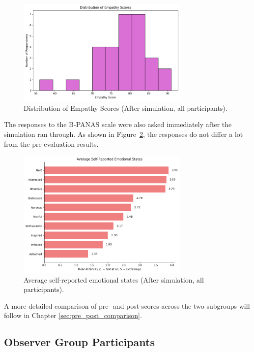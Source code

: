 \begin{figure}[H]
\centering
\includegraphics[width=0.75\textwidth]{../../Figures/empathy_scores_post_all.png}
\caption{Distribution of Empathy Scores (After simulation, all participants).}
\label{fig:empathy_scores_post_all}
\end{figure}

\vspace{1em}

The responses to the B-PANAS scale were also asked immediately after the simulation ran through. As shown in Figure~\ref{fig:emotional_post_all}, the responses do not differ a lot from the pre-evaluation results. 

\begin{figure}[htbp]
    \centering
    \includegraphics[width=0.75\textwidth]{../../Figures/emotional-post-all.png}
    \caption{Average self-reported emotional states (After simulation, all participants).}
    \label{fig:emotional_post_all}
\end{figure}

A more detailed comparison of pre- and post-scores across the two subgroups will follow in Chapter \ref{sec:pre_post_comparison}.

\subsection{Observer Group Participants}

